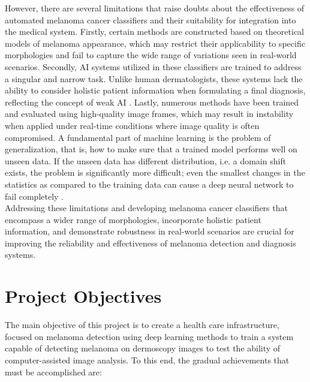 However, there are several limitations that raise doubts about the
effectiveness of automated melanoma cancer classifiers and their suitability
for integration into the medical system. Firstly, certain methods are
constructed based on theoretical models of melanoma appearance, which may
restrict their applicability to specific morphologies and fail to capture the
wide range of variations seen in real-world scenarios. Secondly, AI systems
utilized in these classifiers are trained to address a singular and narrow
task. Unlike human dermatologists, these systems lack the ability to consider
holistic patient information when formulating a final diagnosis, reflecting the
concept of weak AI \cite{WeakAI}. Lastly, numerous methods have been trained
and evaluated using high-quality image frames, which may result in instability
when applied under real-time conditions where image quality is often
compromised. A fundamental part of machine learning is the problem of
generalization, that is, how to make sure that a trained model performs well on
unseen data. If the unseen data has different distribution, i.e. a domain shift
exists, the problem is significantly more difficult; even the smallest changes
in the statistics as compared to the training data can cause a deep neural
network to fail completely \cite{DomainShift}. \\

Addressing these limitations and developing melanoma cancer classifiers that
encompass a wider range of morphologies, incorporate holistic patient
information, and demonstrate robustness in real-world scenarios are crucial for
improving the reliability and effectiveness of melanoma detection and diagnosis
systems.

\section{Project Objectives}

The main objective of this project is to create a health care infrastructure,
focused on melanoma detection using deep learning methods to train a system
capable of detecting melanoma on dermoscopy images to test the ability of
computer-assisted image analysis. To this end, the gradual achievements that
must be accomplished are:

